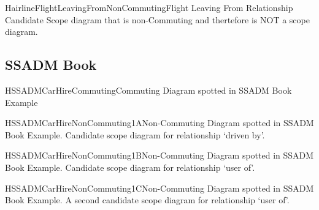 \begin{erboxedFigure}{H}{airlineFlightLeavingFromNonCommuting}{Flight Leaving From Relationship Candidate Scope diagram that is non-Commuting and thertefore is NOT a scope diagram.}

\end{erboxedFigure}

\subsection{SSADM Book}
\begin{erboxedFigure}{H}{SSADMCarHireCommuting}{Commuting Diagram spotted in SSADM Book Example}

\end{erboxedFigure}

\begin{erboxedFigure}{H}{SSADMCarHireNonCommuting1A}{Non-Commuting Diagram spotted in SSADM Book Example. Candidate scope diagram for relationship `driven by'.}

\end{erboxedFigure}

\begin{erboxedFigure}{H}{SSADMCarHireNonCommuting1B}{Non-Commuting Diagram spotted in SSADM Book Example. Candidate scope diagram for relationship `user of'.}

\end{erboxedFigure}

\begin{erboxedFigure}{H}{SSADMCarHireNonCommuting1C}{Non-Commuting Diagram spotted in SSADM Book Example. A second candidate scope diagram for relationship `user of'.}

\end{erboxedFigure}